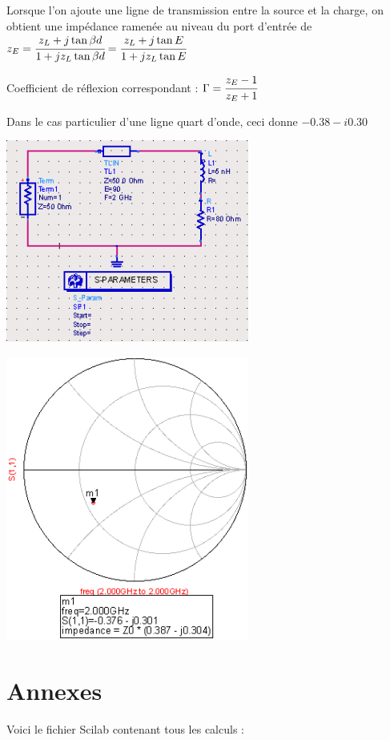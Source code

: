 \documentclass[10pt]{article}
\begin{document}
   Lorsque l’on ajoute une ligne de transmission entre la source et la charge, on obtient une impédance ramenée au niveau du port d’entrée de $z_E = \cfrac{z_L +j \tan{\beta d}}{1 + j z_L \tan{\beta d}}=\cfrac{z_L +j \tan{E}}{1 + j z_L \tan{E}}$

   Coefficient de réflexion correspondant : $\Gamma=\cfrac{z_E-1}{z_E+1}$

   Dans le cas particulier d’une ligne quart d’onde, ceci donne $-0.38-i0.30$

   \includegraphics[width=8cm]{I2_b_circuit.PNG}

   \includegraphics[width=8cm]{I2_b_smith.PNG}

 \part{Annexes}
  Voici le fichier Scilab contenant tous les calculs :
\end{document}
